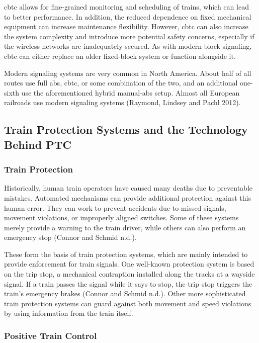 \documentclass[11pt, titlepage]{article}
\begin{document}
\gls{cbtc} allows for fine-grained monitoring and scheduling of trains, which can
lead to better performance. In addition, the reduced dependence on fixed mechanical
equipment can increase maintenance flexibility. However, \gls{cbtc} can also
increase the system complexity and introduce more potential safety concerns,
especially if the wireless networks are inadequately secured. As with modern block
signaling, \gls{cbtc} can either replace an older fixed-block system or function
alongside it.

Modern signaling systems are very common in North America. About half of all routes
use full \gls{abs}, \gls{cbtc}, or some combination of the two, and an additional
one-sixth use the aforementioned hybrid manual-\gls{abs} setup. Almost all European
railroads use modern signaling systems (Raymond, Lindsey and Pachl 2012).

\subsection{Train Protection Systems and the Technology Behind PTC}

\subsubsection{Train Protection}

Historically, human train operators have caused many deaths due to preventable
mistakes. Automated mechanisms can provide additional protection against this human
error. They can work to prevent accidents due to missed signals, movement
violations, or improperly aligned switches. Some of these systems merely provide a
warning to the train driver, while others can also perform an emergency stop
(Connor and Schmid n.d.).

These form the basis of train protection systems, which are mainly intended to
provide enforcement for train signals. One well-known protection system is based on
the trip stop, a mechanical contraption installed along the tracks at a wayside
signal. If a train passes the signal while it says to stop, the trip stop triggers
the train’s emergency brakes (Connor and Schmid n.d.). Other more sophisticated
train protection systems can guard against both movement and speed violations by
using information from the train itself.

\subsubsection{Positive Train Control}
\end{document}

